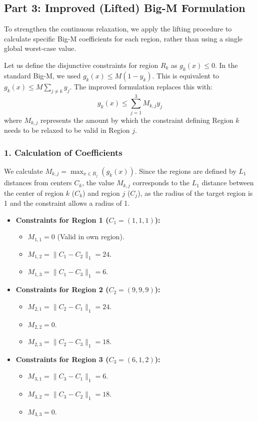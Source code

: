 \documentclass{article} %
\begin{document}
    \subsection*{Part 3: Improved (Lifted) Big-M Formulation}

    To strengthen the continuous relaxation, we apply the lifting procedure to calculate specific Big-M coefficients for each region, rather than using a single global worst-case value.

    Let us define the disjunctive constraints for region $R_k$ as $g_k(x) \le 0$. In the standard Big-M, we used $g_k(x) \le M(1-y_k)$. This is equivalent to $g_k(x) \le M \sum_{j \ne k} y_j$.
    The improved formulation replaces this with:
    \[ g_k(x) \le \sum_{j=1}^3 M_{k,j} y_j \]
    where $M_{k,j}$ represents the amount by which the constraint defining Region $k$ needs to be relaxed to be valid in Region $j$.

    \subsubsection*{1. Calculation of Coefficients}
    We calculate $M_{k,j} = \max_{x \in R_j} (g_k(x))$. Since the regions are defined by $L_1$ distances from centers $C_k$, the value $M_{k,j}$ corresponds to the $L_1$ distance between the center of region $k$ ($C_k$) and region $j$ ($C_j$), as the radius of the target region is 1 and the constraint allows a radius of 1.

    \begin{itemize}
        \item \textbf{Constraints for Region 1 ($C_1=(1,1,1)$):}
        \begin{itemize}
            \item $M_{1,1} = 0$ (Valid in own region).
            \item $M_{1,2} = \|C_1 - C_2\|_1 = 24$.
            \item $M_{1,3} = \|C_1 - C_3\|_1 = 6$.
        \end{itemize}
        \item \textbf{Constraints for Region 2 ($C_2=(9,9,9)$):}
        \begin{itemize}
            \item $M_{2,1} = \|C_2 - C_1\|_1 = 24$.
            \item $M_{2,2} = 0$.
            \item $M_{2,3} = \|C_2 - C_3\|_1 = 18$.
        \end{itemize}
        \item \textbf{Constraints for Region 3 ($C_3=(6,1,2)$):}
        \begin{itemize}
            \item $M_{3,1} = \|C_3 - C_1\|_1 = 6$.
            \item $M_{3,2} = \|C_3 - C_2\|_1 = 18$.
            \item $M_{3,3} = 0$.
        \end{itemize}
    \end{itemize}
\end{document}
